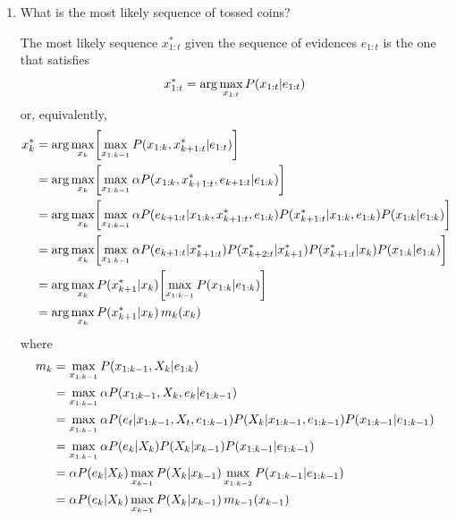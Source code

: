 \documentclass[11pt, a4paper]{article}
\begin{document}
\begin{enumerate}
    \item What is the most likely sequence of tossed coins?
    
    \begin{solution}
        The most likely sequence $x_{1:t}^*$ given the sequence of evidences $e_{1:t}$ is the one that satisfies
        \begin{equation*}
            x_{1:t}^* = \arg \max_{x_{1:t}} P(x_{1:t} \vert e_{1:t})
        \end{equation*}
        or, equivalently,
        \begin{align*}
            x_k^* & = \arg \max_{x_k} \sbk*{ \max_{x_{1:k-1}} P(x_{1:k}, x^*_{k+1:t} \knowing e_{1:t}) } \\
            & = \arg \max_{x_k} \sbk*{ \max_{x_{1:k-1}} \alpha P(x_{1:k}, x^*_{k+1:t}, e_{k+1:t} \knowing e_{1:k}) } \\
            & = \arg \max_{x_k} \sbk*{ \max_{x_{1:k-1}} \alpha P(e_{k+1:t} \knowing x_{1:k}, x^*_{k+1:t}, e_{1:k}) P(x^*_{k+1:t} \knowing x_{1:k}, e_{1:k}) P(x_{1:k} \knowing e_{1:k}) } \\
            & = \arg \max_{x_k} \sbk*{ \max_{x_{1:k-1}} \alpha P(e_{k+1:t} \knowing x^*_{k+1:t}) P(x^*_{k+2:t} \knowing x^*_{k+1}) P(x^*_{k+1:t} \knowing x_{k}) P(x_{1:k} \knowing e_{1:k}) } \\
            & = \arg \max_{x_k} P(x^*_{k+1} \knowing x_{k}) \sbk*{ \max_{x_{1:k-1}} P(x_{1:k} \knowing e_{1:k}) } \\
            & = \arg \max_{x_k} P(x^*_{k+1} \knowing x_{k}) \, m_k(x_k)
        \end{align*}
        where
        \begin{align*}
            m_k & = \max_{x_{1:k-1}} P(x_{1:k-1}, X_k \knowing e_{1:k}) \\
            & = \max_{x_{1:k-1}} \alpha P(x_{1:k-1}, X_k, e_k \knowing e_{1:k-1}) \\
            & = \max_{x_{1:k-1}} \alpha P(e_t \knowing x_{1:k-1}, X_t, e_{1:k-1}) P(X_k \knowing x_{1:k-1}, e_{1:k-1}) P(x_{1:k-1} \knowing e_{1:k-1}) \\
            & = \max_{x_{1:k-1}} \alpha P(e_k \knowing X_k) P(X_k \knowing x_{k-1}) P(x_{1:k-1} \knowing e_{1:k-1}) \\
            & = \alpha P(e_k \knowing X_k) \max_{x_{k-1}} P(X_k \knowing x_{k-1}) \max_{x_{1:k - 2}} P(x_{1:k-1} \knowing e_{1:k-1}) \\
            & = \alpha P(e_k \knowing X_k) \max_{x_{k-1}} P(X_k \knowing x_{k-1}) \, m_{k-1}(x_{k-1})

\end{align*}
\end{solution}
\end{enumerate}
\end{document}
